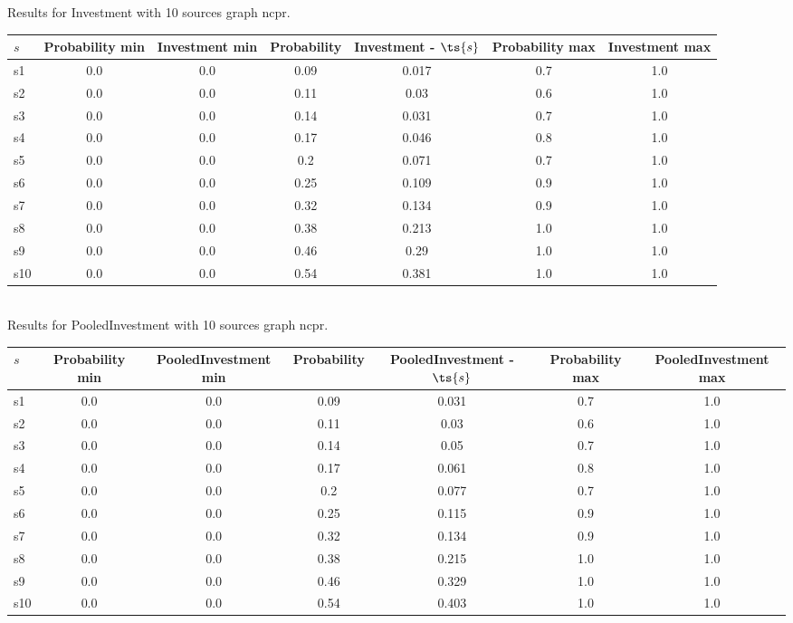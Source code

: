\documentclass{article}
\begin{document}
\noindent Results for Investment with 10 sources graph ncpr.

\noindent\begin{tabular}{|l|c|c|c|c|c|c|}
\hline
$s$& Probability min & Investment min & Probability & Investment - $\ts{s}$ & Probability max & Investment max\\
\hline
s1 &0.0 & 0.0 & 0.09 & 0.017 & 0.7 & 1.0\\
\hline
s2 &0.0 & 0.0 & 0.11 & 0.03 & 0.6 & 1.0\\
\hline
s3 &0.0 & 0.0 & 0.14 & 0.031 & 0.7 & 1.0\\
\hline
s4 &0.0 & 0.0 & 0.17 & 0.046 & 0.8 & 1.0\\
\hline
s5 &0.0 & 0.0 & 0.2 & 0.071 & 0.7 & 1.0\\
\hline
s6 &0.0 & 0.0 & 0.25 & 0.109 & 0.9 & 1.0\\
\hline
s7 &0.0 & 0.0 & 0.32 & 0.134 & 0.9 & 1.0\\
\hline
s8 &0.0 & 0.0 & 0.38 & 0.213 & 1.0 & 1.0\\
\hline
s9 &0.0 & 0.0 & 0.46 & 0.29 & 1.0 & 1.0\\
\hline
s10 &0.0 & 0.0 & 0.54 & 0.381 & 1.0 & 1.0\\
\hline
\end{tabular}\\

\noindent Results for PooledInvestment with 10 sources graph ncpr.

\noindent\begin{tabular}{|l|c|c|c|c|c|c|}
\hline
$s$& Probability min & PooledInvestment min & Probability & PooledInvestment - $\ts{s}$ & Probability max & PooledInvestment max\\
\hline
s1 &0.0 & 0.0 & 0.09 & 0.031 & 0.7 & 1.0\\
\hline
s2 &0.0 & 0.0 & 0.11 & 0.03 & 0.6 & 1.0\\
\hline
s3 &0.0 & 0.0 & 0.14 & 0.05 & 0.7 & 1.0\\
\hline
s4 &0.0 & 0.0 & 0.17 & 0.061 & 0.8 & 1.0\\
\hline
s5 &0.0 & 0.0 & 0.2 & 0.077 & 0.7 & 1.0\\
\hline
s6 &0.0 & 0.0 & 0.25 & 0.115 & 0.9 & 1.0\\
\hline
s7 &0.0 & 0.0 & 0.32 & 0.134 & 0.9 & 1.0\\
\hline
s8 &0.0 & 0.0 & 0.38 & 0.215 & 1.0 & 1.0\\
\hline
s9 &0.0 & 0.0 & 0.46 & 0.329 & 1.0 & 1.0\\
\hline
s10 &0.0 & 0.0 & 0.54 & 0.403 & 1.0 & 1.0\\
\hline
\end{tabular}\\
\end{document}
